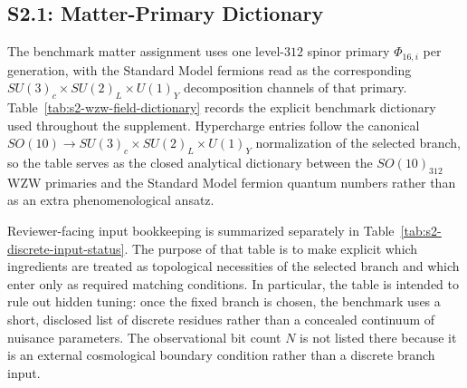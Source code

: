 \documentclass[11pt]{article}
\begin{document}
\subsection*{S2.1: Matter-Primary Dictionary}

The benchmark matter assignment uses one level-$312$ spinor primary $\Phi_{16,i}$ per generation, with the Standard Model fermions read as the corresponding $SU(3)_c\times SU(2)_L\times U(1)_Y$ decomposition channels of that primary. Table~\ref{tab:s2-wzw-field-dictionary} records the explicit benchmark dictionary used throughout the supplement. Hypercharge entries follow the canonical $SO(10)\to SU(3)_c\times SU(2)_L\times U(1)_Y$ normalization of the selected branch, so the table serves as the closed analytical dictionary between the $SO(10)_{312}$ WZW primaries and the Standard Model fermion quantum numbers rather than as an extra phenomenological ansatz.

Reviewer-facing input bookkeeping is summarized separately in Table~\ref{tab:s2-discrete-input-status}. The purpose of that table is to make explicit which ingredients are treated as topological necessities of the selected branch and which enter only as required matching conditions. In particular, the table is intended to rule out hidden tuning: once the fixed branch is chosen, the benchmark uses a short, disclosed list of discrete residues rather than a concealed continuum of nuisance parameters. The observational bit count $N$ is not listed there because it is an external cosmological boundary condition rather than a discrete branch input.
\end{document}
